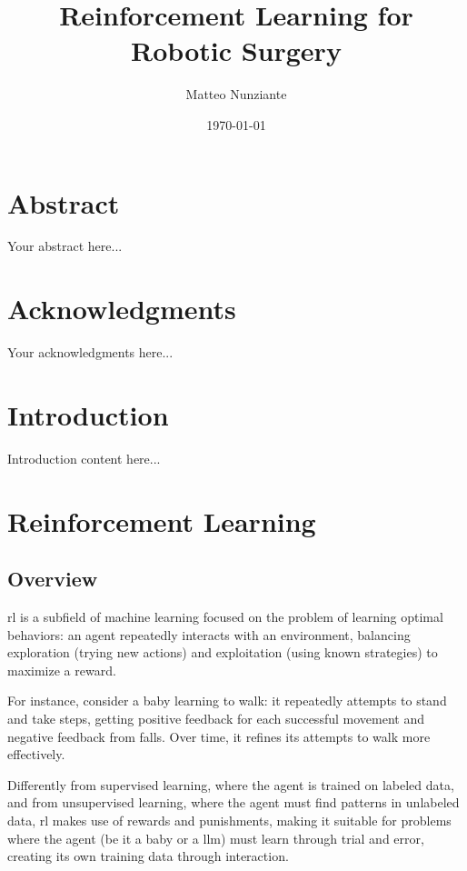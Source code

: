 \documentclass[a4paper,11pt]{report}
\title{\textbf{Reinforcement Learning for Robotic Surgery}}
\author{Matteo Nunziante}
\date{\today}
\theoremstyle{definition}
\theoremstyle{plain}
\begin{document}
\maketitle

\chapter*{Abstract}
Your abstract here...

\chapter*{Acknowledgments}
Your acknowledgments here...

\tableofcontents
\listoffigures
\listoftables

\printglossary[type=\acronymtype]

\chapter{Introduction}
Introduction content here...

\chapter{Reinforcement Learning}
\section{Overview}

\gls{rl} is a subfield of machine learning focused on the problem of learning 
optimal behaviors: an agent repeatedly interacts with an environment, balancing 
exploration (trying new actions) and exploitation (using known strategies) 
to maximize a reward. \

For instance, consider a baby learning to walk: it repeatedly attempts to stand 
and take steps, getting positive feedback for each successful movement and 
negative feedback from falls. Over time, it refines its attempts to walk 
more effectively. \

Differently from supervised learning, where the agent is trained on labeled data, 
and from unsupervised learning, where the agent must find patterns in unlabeled data,
\gls{rl} makes use of rewards and punishments, making it suitable for problems 
where the agent (be it a baby or a \gls{llm}) must learn through trial and error, creating its own training data 
through interaction.
\end{document}
